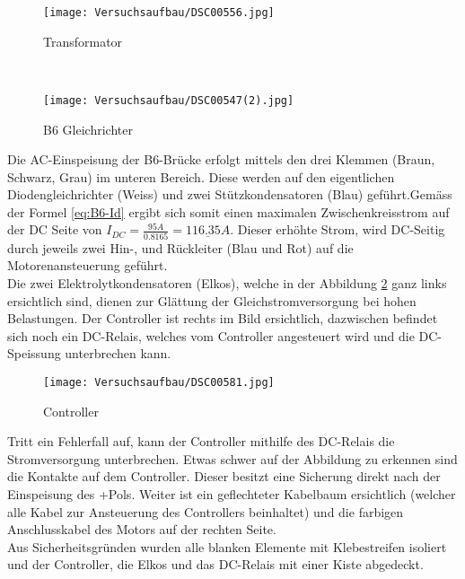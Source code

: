 \begin{figure}[H]
	\centering
	\begin{minipage}[H]{.4\linewidth} %
		\centering
		\texttt{[image: Versuchsaufbau/DSC00556.jpg]}
		\caption[Transformator Versuchsaufbau]{Transformator}
		\label{fig:Trafo}
	\end{minipage}
	\ %
	\begin{minipage}[H]{.4\linewidth} %
		\centering
		\texttt{[image: Versuchsaufbau/DSC00547(2).jpg]}
		\caption[B6 Gleichrichter]{B6 Gleichrichter}
		\label{fig:B6}
	\end{minipage}
\end{figure}

Die AC-Einspeisung der B6-Brücke erfolgt mittels den drei Klemmen (Braun, Schwarz, Grau) im unteren Bereich. Diese werden auf den eigentlichen Diodengleichrichter (Weiss) und zwei Stützkondensatoren (Blau) geführt.Gemäss der Formel \ref{eq:B6-Id} ergibt sich somit einen maximalen Zwischenkreisstrom auf der DC Seite von $I_{DC}=\frac{95A}{0.8165} =\underline{116.35A}$.
Dieser erhöhte Strom, wird DC-Seitig durch jeweils zwei Hin-, und Rückleiter (Blau und Rot) auf die Motorenansteuerung geführt.\\
Die zwei Elektrolytkondensatoren (Elkos), welche in der Abbildung \ref{fig:Controller} ganz links ersichtlich sind, dienen zur Glättung der Gleichstromversorgung bei hohen Belastungen. Der Controller ist rechts im Bild ersichtlich, dazwischen befindet sich noch ein DC-Relais, welches vom Controller angesteuert wird und die DC-Speissung unterbrechen kann.

\begin{figure}[H]
	\begin{center}
		\texttt{[image: Versuchsaufbau/DSC00581.jpg]}
		\caption[Controller]{Controller}
		\label{fig:Controller}
	\end{center}
\end{figure}

Tritt ein Fehlerfall auf, kann der Controller mithilfe des DC-Relais die Stromversorgung unterbrechen. Etwas schwer auf der Abbildung zu erkennen sind die Kontakte auf dem Controller. Dieser besitzt eine Sicherung direkt nach der Einspeisung des +Pols. Weiter ist ein geflechteter Kabelbaum ersichtlich (welcher alle Kabel zur Ansteuerung des Controllers beinhaltet) und die farbigen Anschlusskabel des Motors auf der rechten Seite.\\
Aus Sicherheitsgründen wurden alle blanken Elemente mit Klebestreifen isoliert und der Controller, die Elkos und das DC-Relais mit einer Kiste abgedeckt.

